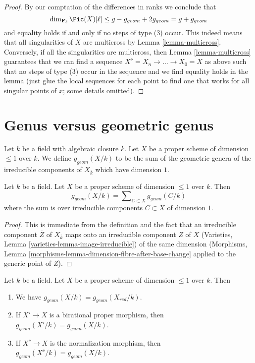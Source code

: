 \begin{proof}
By our comptation of the differences in ranks we conclude that
$$
\dim_{\mathbf{F}_\ell} \Pic(X)[\ell] \leq
g - g_{geom} + 2g_{geom} = g + g_{geom}
$$
and equality holds if and only if no steps of type (3) occur.
This indeed means that all singularities of $X$ are multicross
by Lemma \ref{lemma-multicross}. Conversely, if all the singularities
are multicross, then Lemma \ref{lemma-multicross} guarantees that
we can find a sequence $X^\nu = X_n \to \ldots \to X_0 = X$
as above such that no steps of type (3) occur in the sequence
and we find equality holds in the lemma (just glue the local sequences
for each point to find one that works for all singular points of $x$;
some details omitted).
\end{proof}





\section{Genus versus geometric genus}
\label{section-genus-geometric-genus}

\noindent
Let $k$ be a field with algebraic closure $\overline{k}$.
Let $X$ be a proper scheme of dimension $\leq 1$ over $k$.
We define $g_{geom}(X/k)$ to be the sum of the geometric genera
of the irreducible components of $X_{\overline{k}}$ which have dimension $1$.

\begin{lemma}
\label{lemma-bound-geometric-genus}
Let $k$ be a field. Let $X$ be a proper scheme of dimension $\leq 1$ over $k$.
Then
$$
g_{geom}(X/k) = \sum\nolimits_{C \subset X} g_{geom}(C/k)
$$
where the sum is over irreducible components $C \subset X$ of dimension $1$.
\end{lemma}

\begin{proof}
This is immediate from the definition and the fact that an irreducible
component $\overline{Z}$ of $X_{\overline{k}}$ maps onto an
irreducible component $Z$ of $X$
(Varieties, Lemma \ref{varieties-lemma-image-irreducible})
of the same dimension
(Morphisms, Lemma \ref{morphisms-lemma-dimension-fibre-after-base-change}
applied to the generic point of $\overline{Z}$).
\end{proof}

\begin{lemma}
\label{lemma-geometric-genus-normalization}
Let $k$ be a field. Let $X$ be a proper scheme of dimension $\leq 1$ over $k$.
Then
\begin{enumerate}
\item We have $g_{geom}(X/k) = g_{geom}(X_{red}/k)$.
\item If $X' \to X$ is a birational proper morphism, then
$g_{geom}(X'/k) = g_{geom}(X/k)$.
\item If $X^\nu \to X$ is the normalization morphism, then
$g_{geom}(X^\nu/k) = g_{geom}(X/k)$.
\end{enumerate}
\end{lemma}

